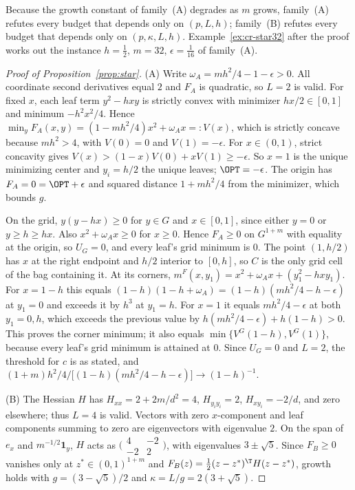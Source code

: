 Because the growth constant of family~(A) degrades as $m$ grows,
family~(A) refutes every budget that depends only on $(p,L,h)$; family~(B)
refutes every budget that depends only on $(p,\kappa,L,h)$.
Example~\ref{ex:cr-star32} after the proof works out the instance
$h=\frac12$, $m=32$, $\epsilon=\frac1{16}$ of family~(A).

\begin{proof}[Proof of Proposition~\ref{prop:star}]
(A) Write $\omega_A=mh^2/4-1-\epsilon>0$. All coordinate second derivatives
equal $2$ and $F_A$ is quadratic, so $L=2$ is valid. For fixed $x$, each leaf
term $y^2-hxy$ is strictly convex with minimizer $hx/2\in[0,1]$ and minimum
$-h^2x^2/4$. Hence $\min_yF_A(x,y)=(1-mh^2/4)x^2+\omega_Ax=:V(x)$, which is
strictly concave because $mh^2>4$, with $V(0)=0$ and $V(1)=-\epsilon$. For
$x\in(0,1)$, strict concavity gives $V(x)>(1-x)V(0)+xV(1)\ge-\epsilon$. So
$x=1$ is the unique minimizing center and $y_i=h/2$ the unique leaves;
$\OPT=-\epsilon$. The origin has $F_A=0=\OPT+\epsilon$ and squared distance
$1+mh^2/4$ from the minimizer, which bounds $g$.

On the grid, $y(y-hx)\ge0$ for $y\in G$ and $x\in[0,1]$, since either $y=0$
or $y\ge h\ge hx$. Also $x^2+\omega_Ax\ge0$ for $x\ge0$. Hence $F_A\ge0$ on
$G^{1+m}$ with equality at the origin, so $U_G=0$, and every leaf's grid
minimum is $0$. The point $(1,h/2)$ has $x$ at the right endpoint and $h/2$
interior to $[0,h]$, so $C$ is the only grid cell of the bag containing it.
At its corners, $m^F(x,y_1)=x^2+\omega_Ax+(y_1^2-hxy_1)$. For $x=1-h$ this
equals $(1-h)(1-h+\omega_A)=(1-h)(mh^2/4-h-\epsilon)$ at $y_1=0$ and exceeds
it by $h^3$ at $y_1=h$. For $x=1$ it equals $mh^2/4-\epsilon$ at both
$y_1=0,h$, which exceeds the previous value by
$h(mh^2/4-\epsilon)+h(1-h)>0$. This proves the corner minimum; it also equals
$\min\{V^G(1-h),V^G(1)\}$, because every leaf's grid minimum is attained at
$0$. Since $U_G=0$ and $L=2$, the threshold for $c$ is as stated, and
$(1+m)h^2/4\big/\bigl[(1-h)(mh^2/4-h-\epsilon)\bigr]\to(1-h)^{-1}$.

(B) The Hessian $H$ has $H_{xx}=2+2m/d^2=4$, $H_{y_iy_i}=2$,
$H_{xy_i}=-2/d$, and zero elsewhere; thus $L=4$ is valid. Vectors with zero
$x$-component and leaf components summing to zero are eigenvectors with
eigenvalue $2$. On the span of $e_x$ and $m^{-1/2}\mathbf 1_y$, $H$ acts as
$\bigl(\begin{smallmatrix}4&-2\\-2&2\end{smallmatrix}\bigr)$, with
eigenvalues $3\pm\sqrt5$. Since $F_B\ge0$ vanishes only at
$z^*\in(0,1)^{1+m}$ and $F_B(z)=\frac12(z-z^*)^{\T}H(z-z^*)$, growth holds
with $g=(3-\sqrt5)/2$ and $\kappa=L/g=2(3+\sqrt5)$.


\end{proof}
